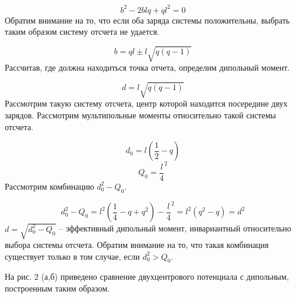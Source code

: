 \begin{equation*}
b^2-2\mathit{blq}+ql^2=0
\end{equation*}
Обратим внимание на то, что если оба заряда системы положительны, выбрать таким образом систему отсчета не удается.

\begin{equation*}
b=\mathit{ql}\pm l\sqrt{q\left(q-1\right)}
\end{equation*}
Рассчитав, где должна находиться точка отчета, определим дипольный момент.

\begin{equation*}
d=l\sqrt{q\left(q-1\right)}
\end{equation*}
Рассмотрим такую систему отсчета, центр которой находится посередине двух зарядов. Рассмотрим мультипольные моменты относительно такой системы отсчета.

\begin{equation*}
d_0=l\left(\frac 1 2-q\right)
\end{equation*}
\begin{equation*}
Q_0=\frac l 4^2
\end{equation*}
Рассмотрим комбинацию  $d_0^2-Q_0$.

\begin{equation*}
d_0^2-Q_0=l^2\left(\frac 1 4-q+q^2\right)-\frac l 4^2=l^2\left(q^2-q\right)=d^2
\end{equation*}
 $d=\sqrt{d_0^2-Q_0}$ -- эффективный дипольный момент, инвариантный относительно выбора системы отсчета. Обратим внимание на то, что такая комбинация существует только в том
случае, если  $d_0^2>Q_0$.

На рис. 2 (а,б) приведено сравнение двухцентрового потенциала с дипольным, построенным таким образом.


